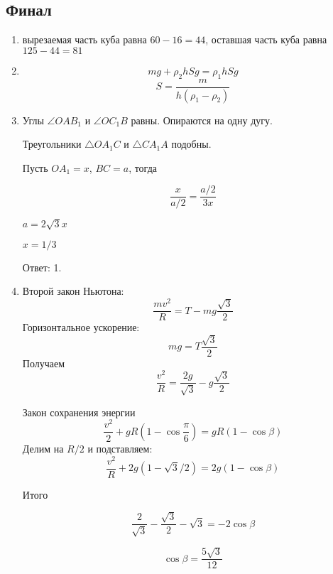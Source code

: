 \documentclass[12pt]{article} %
\begin{document}
\subsection*{Финал}

\begin{enumerate}
\item вырезаемая часть куба равна $60 - 16 = 44$, оставшая часть куба равна  $125 - 44 = 81$
\item 
\[ 
    mg + \rho_2 h Sg = \rho_1 h S g
\]
\[
    S = \frac{m}{h(\rho_1 - \rho_2)}
\]
\item Углы $\angle OAB_1$ и $\angle OC_1B$ равны. Опираются на одну дугу. 

Треугольники $\triangle OA_1C$ и $\triangle CA_1A$ подобны.

Пусть $OA_1 = x$, $BC = a$, тогда 

\[
\frac{x}{a/2} = \frac{a/2}{3x}  
\]

$a = 2\sqrt{3}x$

$x=1/3$

Ответ: 1.

\item Второй закон Ньютона:
\[
\frac{mv^2}{R} = T - mg \frac{\sqrt{3}}{2} 
\]
Горизонтальное ускорение:
\[
mg = T \frac{\sqrt{3}}{2}  
\]
Получаем 
\[
\frac{v^2}{R} = \frac{2g}{\sqrt{3}} - g \frac{\sqrt{3}}{2}  
\]

Закон сохранения энергии
\[
\frac{v^2}{2} +gR\left(1- \cos \frac{\pi}{6} \right)  = gR(1-\cos\beta)  
\]
Делим на $R/2$ и подставляем:
\[
\frac{v^2}{R} +2g(1- \sqrt{3}/2)  = 2g(1-\cos\beta)  
\]

Итого

\[
\frac{2}{\sqrt{3}} - \frac{\sqrt{3}}{2} - \sqrt{3} = -2\cos\beta  
\]

\[
\cos\beta = \frac{5\sqrt{3}}{12}
\]

\end{enumerate} 
  
\end{document}
